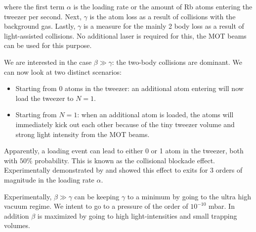 where the first term $\alpha$ is the loading rate or the amount of Rb atoms entering the tweezer per second. Next, $\gamma$ is the atom loss as a result of collisions with the background gas. Lastly, $\gamma$ is a measure for the mainly 2 body loss as a result of light-assisted collisions. No additional laser is required for this, the MOT beams can be used for this purpose.  

We are interested in the case $\beta \gg \gamma$: the two-body collisions are dominant. We can now look at two distinct scenarios:

\begin{itemize}
	\item Starting from 0 atoms in the tweezer: an additional atom entering will now load the tweezer to $N=1$. 
	
	\item Starting from $N=1$: when an additional atom is loaded, the atoms will immediately kick out each other because of the tiny tweezer volume and strong light intensity from the MOT beams. 
\end{itemize}

Apparently, a loading event can lead to either 0 or 1 atom in the tweezer, both with $50\%$ probability. This is known as the collisional blockade effect. Experimentally demonstrated by \cite{Schlosser2001} and \cite{Schlosser2002} showed this effect to exits for 3 orders of magnitude in the loading rate $\alpha$.

Experimentally, $\beta \gg \gamma$ can be keeping $\gamma$ to a minimum by going to the ultra high vacuum regime. We intent to go to a pressure of the order of $10^{-10}$ mbar. In addition $\beta$ is maximized by going to high light-intensities and small trapping volumes. 
